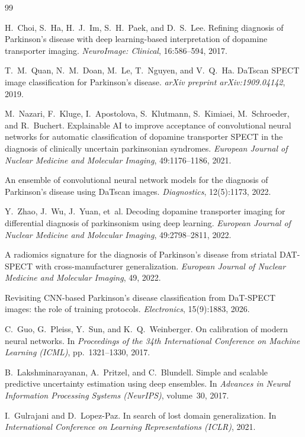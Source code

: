 \documentclass[10pt]{article}
\begin{document}
\begin{thebibliography}{99}

 H.~Choi, S.~Ha, H.~J.~Im, S.~H.~Paek, and D.~S.~Lee. Refining diagnosis of Parkinson's disease with deep learning-based interpretation of dopamine transporter imaging. \emph{NeuroImage: Clinical}, 16:586--594, 2017.

 T.~M.~Quan, N.~M.~Doan, M.~Le, T.~Nguyen, and V.~Q.~Ha. DaTscan SPECT image classification for Parkinson's disease. \emph{arXiv preprint arXiv:1909.04142}, 2019.

 M.~Nazari, F.~Kluge, I.~Apostolova, S.~Klutmann, S.~Kimiaei, M.~Schroeder, and R.~Buchert. Explainable AI to improve acceptance of convolutional neural networks for automatic classification of dopamine transporter SPECT in the diagnosis of clinically uncertain parkinsonian syndromes. \emph{European Journal of Nuclear Medicine and Molecular Imaging}, 49:1176--1186, 2021.

 An ensemble of convolutional neural network models for the diagnosis of Parkinson's disease using DaTscan images. \emph{Diagnostics}, 12(5):1173, 2022.

 Y.~Zhao, J.~Wu, J.~Yuan, et~al. Decoding dopamine transporter imaging for differential diagnosis of parkinsonism using deep learning. \emph{European Journal of Nuclear Medicine and Molecular Imaging}, 49:2798--2811, 2022.

 A radiomics signature for the diagnosis of Parkinson's disease from striatal DAT-SPECT with cross-manufacturer generalization. \emph{European Journal of Nuclear Medicine and Molecular Imaging}, 49, 2022.

 Revisiting CNN-based Parkinson's disease classification from DaT-SPECT images: the role of training protocols. \emph{Electronics}, 15(9):1883, 2026.

 C.~Guo, G.~Pleiss, Y.~Sun, and K.~Q.~Weinberger. On calibration of modern neural networks. In \emph{Proceedings of the 34th International Conference on Machine Learning (ICML)}, pp.\ 1321--1330, 2017.

 B.~Lakshminarayanan, A.~Pritzel, and C.~Blundell. Simple and scalable predictive uncertainty estimation using deep ensembles. In \emph{Advances in Neural Information Processing Systems (NeurIPS)}, volume~30, 2017.

 I.~Gulrajani and D.~Lopez-Paz. In search of lost domain generalization. In \emph{International Conference on Learning Representations (ICLR)}, 2021.

\end{thebibliography}
\end{document}
